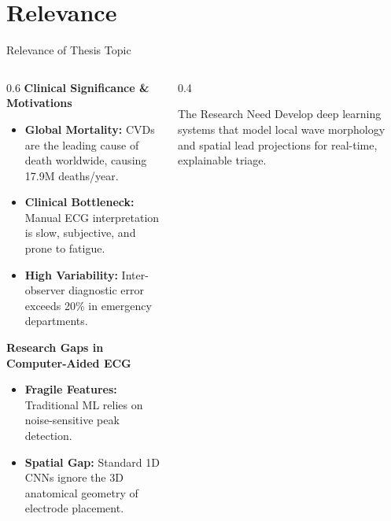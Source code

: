 \documentclass[11pt,aspectratio=169]{beamer}
\begin{document}
\section{Relevance}
\begin{frame}{Relevance of Thesis Topic}
    \begin{columns}[T]
        \begin{column}{0.6\textwidth}
            \textbf{Clinical Significance \& Motivations}
            \begin{itemize}
                \item \textbf{Global Mortality:} CVDs are the leading cause of death worldwide, causing 17.9M deaths/year.
                \item \textbf{Clinical Bottleneck:} Manual ECG interpretation is slow, subjective, and prone to fatigue.
                \item \textbf{High Variability:} Inter-observer diagnostic error exceeds 20\% in emergency departments.
            \end{itemize}
            \vspace{0.2cm}
            \textbf{Research Gaps in Computer-Aided ECG}
            \begin{itemize}
                \item \textbf{Fragile Features:} Traditional ML relies on noise-sensitive peak detection.
                \item \textbf{Spatial Gap:} Standard 1D CNNs ignore the 3D anatomical geometry of electrode placement.
            \end{itemize}
        \end{column}
        \begin{column}{0.4\textwidth}
            \begin{block}{The Research Need}
                Develop deep learning systems that model local wave morphology and spatial lead projections for real-time, explainable triage.
            \end{block}
        \end{column}
    \end{columns}
\end{frame}

\end{document}

